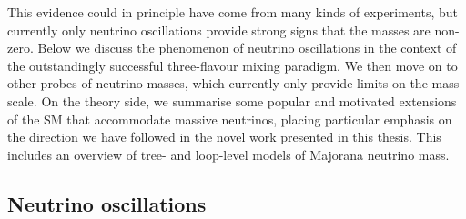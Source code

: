 This evidence could in principle have come from many kinds of experiments, but
currently only neutrino oscillations provide strong signs that the masses are
non-zero. Below we discuss the phenomenon of neutrino oscillations in the
context of the outstandingly successful three-flavour mixing paradigm. We then
move on to other probes of neutrino masses, which currently only provide limits
on the mass scale. On the theory side, we summarise some popular and motivated
extensions of the SM that accommodate massive neutrinos, placing particular
emphasis on the direction we have followed in the novel work presented in this
thesis. This includes an overview of tree- and loop-level models of Majorana
neutrino mass.

\subsection{Neutrino oscillations}

